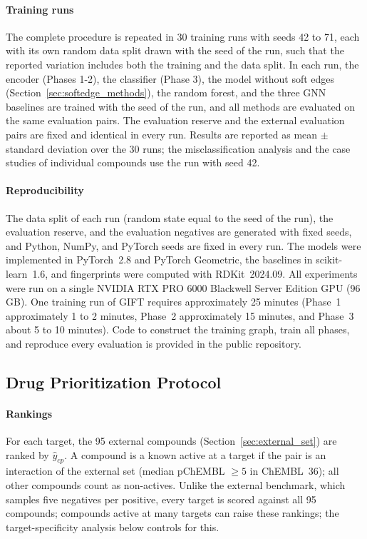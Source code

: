 \documentclass[11pt,letterpaper]{article}
\begin{document}
\paragraph{Training runs}
The complete procedure is repeated in 30 training runs with seeds 42 to 71, each with its own random data split drawn with the seed of the run, such that the reported variation includes both the training and the data split. In each run, the encoder (Phases 1-2), the classifier (Phase 3), the model without soft edges (Section~\ref{sec:softedge_methods}), the random forest, and the three GNN baselines are trained with the seed of the run, and all methods are evaluated on the same evaluation pairs. The evaluation reserve and the external evaluation pairs are fixed and identical in every run. Results are reported as mean $\pm$ standard deviation over the 30 runs; the misclassification analysis and the case studies of individual compounds use the run with seed 42.

\paragraph{Reproducibility}
The data split of each run (random state equal to the seed of the run), the evaluation reserve, and the evaluation negatives are generated with fixed seeds, and Python, NumPy, and PyTorch seeds are fixed in every run. The models were implemented in PyTorch~2.8 and PyTorch Geometric, the baselines in scikit-learn~1.6, and fingerprints were computed with RDKit~2024.09. All experiments were run on a single NVIDIA RTX PRO 6000 Blackwell Server Edition GPU (96 GB). One training run of GIFT requires approximately 25 minutes (Phase~1 approximately 1 to 2 minutes, Phase~2 approximately 15 minutes, and Phase~3 about 5 to 10 minutes). Code to construct the training graph, train all phases, and reproduce every evaluation is provided in the public repository.

\subsection{Drug Prioritization Protocol}
\label{sec:leadprio_methods}

\paragraph{Rankings}
For each target, the 95 external compounds (Section~\ref{sec:external_set}) are ranked by $\hat{y}_{cp}$. A compound is a known active at a target if the pair is an interaction of the external set (median pChEMBL $\geq 5$ in ChEMBL~36); all other compounds count as non-actives. Unlike the external benchmark, which samples five negatives per positive, every target is scored against all 95 compounds; compounds active at many targets can raise these rankings; the target-specificity analysis below controls for this.
\end{document}
